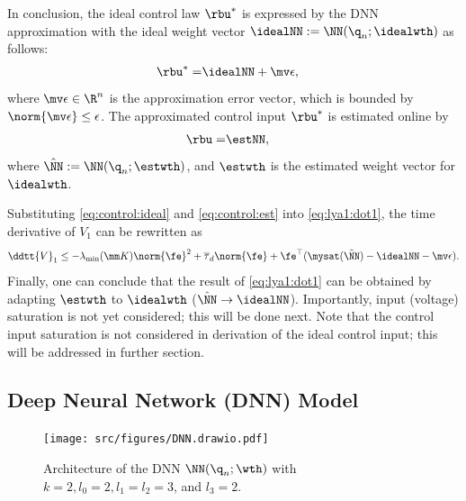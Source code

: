 \documentclass[lettersize,journal]{IEEEtran}
\begin{document}
In conclusion, the ideal control law $\rbu^*$ is expressed by the DNN approximation with the ideal weight vector $\idealNN:=\NN({\q}_n;\idealwth)$ as follows:
\begin{align}
    \rbu^*=& \idealNN+\mv\epsilon
    ,
    \label{eq:control:ideal}
\end{align}
where $\mv\epsilon\in\R^n$ is the approximation error vector, which is bounded by $\norm{\mv\epsilon}\le \epsilon$.
The approximated control input $\rbu^*$ is estimated online by
\begin{align}
    \rbu =& \estNN,
    \label{eq:control:est}
\end{align}
where $\hat\NN:=\NN({\q}_n;\estwth)$, and  $\estwth$ is the estimated weight vector for $\idealwth$.

Substituting \eqref{eq:control:ideal} and \eqref{eq:control:est} into \eqref{eq:lya1:dot1}, the time derivative of $V_1$ can be rewritten as
\begin{equation}
    \ddtt{V}_1
    \le 
    -\lambda_{\min}(\mm K)\norm{\fe}^2
    +
    \overline\tau_d\norm{\fe}
    +
    \fe^\top (\mysat(\hat\NN)-\idealNN-\mv\epsilon)
    .
    \label{eq:lya1:dot2}
\end{equation}
Finally, one can conclude that the result of \eqref{eq:lya1:dot1} can be obtained by adapting $\estwth$ to $\idealwth$ (\ie $\hat\NN\to\idealNN$).
Importantly, input (voltage) saturation
is not yet considered; this will be done next.
Note that the control input saturation is not considered in derivation of the ideal control input; this will be addressed in further section.

\subsection{Deep Neural Network (DNN) Model}\label{sec:sub:NN definition}

\begin{figure}[t]
    \centering
    \texttt{[image: src/figures/DNN.drawio.pdf]}
    \caption{
        Architecture of the DNN $\NN({\q}_n;\wth)$ with $k=2,l_0=2,l_1=l_2=3$, and $l_3=2$.
    }
    \label{fig:DNN}
\end{figure}
\end{document}
